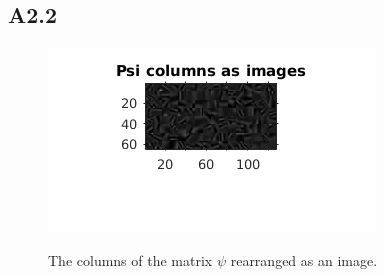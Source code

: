 \documentclass{article}
\begin{document}
\subsection*{A2.2}
\begin{figure}[H]
  \centering
  \includegraphics[scale=0.5]{images/Psi_columns_ksvd}
  \caption \\The columns of the matrix $\psi$ rearranged as an image.
  \label{fig:3}
\end{figure}
\end{document}
